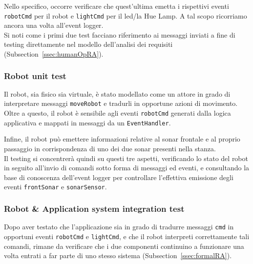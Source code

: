 \documentclass{../llncs}
\newcommand{\codescript}[1]{{\mbox{\small{\texttt{#1}}}}\xspace}
\newcommand{\xss}[1]{\subsectionname~\ref{ssec:#1}}
\newcommand{\subsectionname}{Subsection}
\begin{document}
Nello specifico, occorre verificare che quest'ultima emetta i rispettivi eventi \codescript{robotCmd} per il robot e \codescript{lightCmd} per il led/la Hue Lamp. A tal scopo ricorriamo ancora una volta all'event logger.\\



Si noti come i primi due test facciano riferimento ai messaggi inviati a fine di testing direttamente nel modello dell'analisi dei requisiti (\xss{humanOpRA}).

\subsubsection{Robot unit test}
Il robot, sia fisico sia virtuale, è stato modellato come un attore in grado di interpretare messaggi \codescript{moveRobot} e tradurli in opportune azioni di movimento. Oltre a questo, il robot è sensibile agli eventi \codescript{robotCmd} generati dalla logica applicativa e mappati in messaggi da un \codescript{EventHandler}.

Infine, il robot può emettere informazioni relative al sonar frontale e al proprio passaggio in corrispondenza di uno dei due sonar presenti nella stanza.\\

Il testing si concentrerà quindi su questi tre aspetti, verificando lo stato del robot in seguito all'invio di comandi sotto forma di messaggi ed eventi, e consultando la base di conoscenza dell'event logger per controllare l'effettiva emissione degli eventi \codescript{frontSonar} e \codescript{sonarSensor}.\\



\subsubsection{Robot \& Application system integration test}
Dopo aver testato che l'applicazione sia in grado di tradurre messaggi \codescript{cmd} in opportuni eventi \codescript{robotCmd} e \codescript{lightCmd}, e che il robot interpreti correttamente tali comandi, rimane da verificare che i due componenti continuino a funzionare una volta entrati a far parte di uno stesso sistema (\xss{formalRA}).\\
\end{document}
